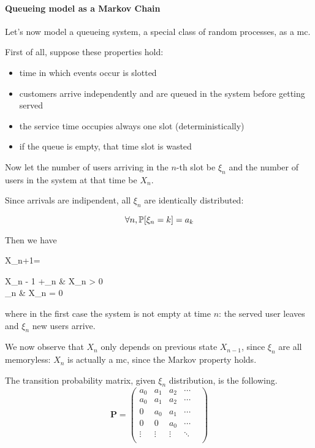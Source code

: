 \paragraph{Queueing model as a Markov Chain}
Let's now model a queueing system, a special class of random processes, as a \gls{mc}.

First of all, suppose these properties hold:
\begin{itemize}
	\item time in which events occur is slotted
	\item customers arrive independently and are queued in the system before getting served
	\item the service time occupies always one slot (deterministically)
	\item if the queue is empty, that time slot is wasted
\end{itemize}

Now let the number of users arriving in the $n$-th slot be $\xi_n$ and the number of users in the system at that time be $X_n$.

Since arrivals are indipendent, all $\xi_n$ are identically distributed:

\begin{equation}
	\forall n, \mathbb{P}[\xi_n = k] = a_k
\end{equation}

Then we have
\begin{esp}
	X_{n+1}= \begin{cases}
		X_n - 1 +\xi_n &   X_n > 0 \\
		\xi_n &   X_n = 0
	\end{cases}
\end{esp}
where in the first case the system is not empty at time $n$: the served user leaves and $\xi_n$ new users arrive.

We now observe that $X_n$ only depends on previous state $X_{n-1}$, since $\xi_n$ are all memoryless: $X_n$ is actually a \gls{mc}, since the Markov property holds.

The transition probability matrix, given $\xi_n$ distribution, is the following.
\begin{equation} \bm P=\begin{pmatrix}
		a_{0} & a_{1} & a_2 & \cdots  \\
		a_{0} & a_{1} & a_2 & \cdots  \\
		0			& a_{0} & a_{1} & \cdots  \\
		0 		& 0			& a_{0} & \cdots  \\
		\vdots & \vdots & \vdots & \ddots &  \\
	\end{pmatrix}
\end{equation}

